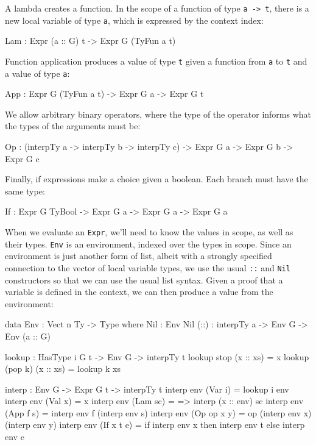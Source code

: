 \noindent
A lambda creates a function.
In the scope of a function of type \texttt{a -> t}, there is a new local variable of type \texttt{a}, which is expressed by the context index:

\begin{code}
Lam : Expr (a :: G) t -> Expr G (TyFun a t)
\end{code}

\noindent
Function application produces a value of type \texttt{t} given a function from  \texttt{a} to \texttt{t} and a value of type \texttt{a}:

\begin{code}
App : Expr G (TyFun a t) -> Expr G a -> Expr G t
\end{code}

\noindent
We allow arbitrary binary operators, where the type of the operator informs what the types of the arguments must be:

\begin{code}
Op  : (interpTy a -> interpTy b -> interpTy c) -> Expr G a -> Expr G b -> 
      Expr G c
\end{code}

\noindent
Finally, if expressions make a choice given a boolean.
Each branch must have the same type:

\begin{code}
If  : Expr G TyBool -> Expr G a -> Expr G a -> Expr G a
\end{code}

\noindent
When we evaluate an \texttt{Expr}, we'll need to know the values in scope, as well as their types.
\texttt{Env} is an environment, indexed over the types in scope.
Since an environment is just another form of list, albeit with a strongly specified connection to the vector of local variable types, we use the usual \texttt{::} and \texttt{Nil} constructors so that we can use the usual list syntax.
Given a proof that a variable is defined in the context, we can then produce a value from the environment:

\begin{code}
data Env : Vect n Ty -> Type where
    Nil  : Env Nil
    (::) : interpTy a -> Env G -> Env (a :: G)

lookup : HasType i G t -> Env G -> interpTy t
lookup stop    (x :: xs) = x
lookup (pop k) (x :: xs) = lookup k xs
\end{code}

\begin{code}[caption={Intepreter definition},label=interpdef]
interp : Env G -> Expr G t -> interpTy t
interp env (Var i)     = lookup i env
interp env (Val x)     = x
interp env (Lam sc)    = \x => interp (x :: env) sc
interp env (App f s)   = interp env f (interp env s)
interp env (Op op x y) = op (interp env x) (interp env y)
interp env (If x t e)  = if interp env x then interp env t 
                                         else interp env e
\end{code}


